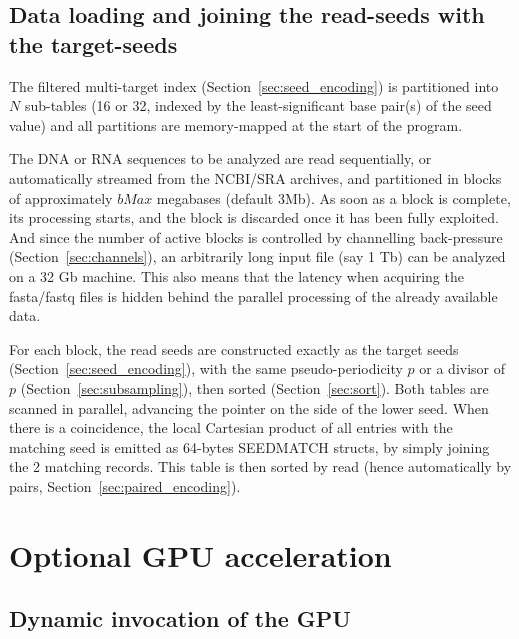 \documentclass[11pt]{article}
\begin{document}
\subsection {Data loading and joining the read-seeds with the target-seeds}
\label{sec:index_load}

The filtered multi-target index (Section~\ref{sec:seed_encoding}) is partitioned
into $N$ sub-tables (16 or 32, indexed by the least-significant
base pair(s) of the seed value) and
all partitions are memory-mapped at the start of the program.

The DNA or RNA sequences to be analyzed are
read sequentially, or automatically streamed from the NCBI/SRA archives,
and partitioned in blocks of
approximately $bMax$ megabases (default 3Mb).
As soon as a block is complete, its processing starts,
and the block is discarded once it has been fully exploited.
And since the number of active blocks is controlled
by channelling back-pressure (Section~\ref{sec:channels}),
an arbitrarily long input file (say 1 Tb)
can be analyzed on a 32 Gb machine.
This also means that the latency when acquiring the fasta/fastq files
is hidden behind the
parallel processing of the already available data.

For each block, the read seeds are constructed exactly as the target seeds
(Section~\ref{sec:seed_encoding}), with the same pseudo-periodicity $p$
or a divisor of $p$ (Section~\ref{sec:subsampling}), then sorted
(Section~\ref{sec:sort}).
Both tables are scanned in parallel, advancing the pointer
on the side of the lower seed. When there is a coincidence,
the local Cartesian product of all entries with the matching seed
is emitted as 64-bytes SEEDMATCH structs, by simply joining
the 2 matching records. This table is then sorted by read (hence
automatically by pairs, Section~\ref{sec:paired_encoding}).


\section{Optional GPU acceleration}
\label{sec:gpu}

\subsection{Dynamic invocation of the GPU}
\label{sec:gpu_accel}
\end{document}
